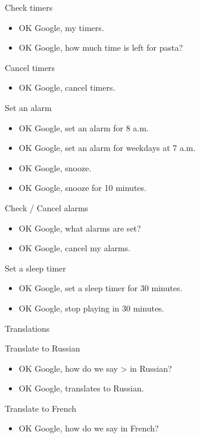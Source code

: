 \documentclass[
  a4paper,
]{article}
\providecommand{\tightlist}{%
  \setlength{\itemsep}{0pt}\setlength{\parskip}{0pt}}\usepackage{longtable,booktabs,array}
\begin{document}
Check timers

\begin{itemize}
\item
  OK Google, my timers.
\item
  OK Google, how much time is left for pasta?
\end{itemize}

Cancel timers

\begin{itemize}
\tightlist
\item
  OK Google, cancel timers.
\end{itemize}

Set an alarm

\begin{itemize}
\item
  OK Google, set an alarm for 8 a.m.
\item
  OK Google, set an alarm for weekdays at 7 a.m.
\item
  OK Google, snooze.
\item
  OK Google, snooze for 10 minutes.~~
\end{itemize}

Check / Cancel alarms

\begin{itemize}
\item
  OK Google, what alarms are set?
\item
  OK Google, cancel my alarms.~~
\end{itemize}

Set a sleep timer

\begin{itemize}
\item
  OK Google, set a sleep timer for 30 minutes.
\item
  OK Google, stop playing in 30 minutes.
\end{itemize}

Translations

Translate to Russian

\begin{itemize}
\item
  OK Google, how do we say \textgreater{} in Russian?
\item
  OK Google, translates to Russian.
\end{itemize}

Translate to French

\begin{itemize}
\tightlist
\item
  OK Google, how do we say in French?
\end{itemize}
\end{document}
